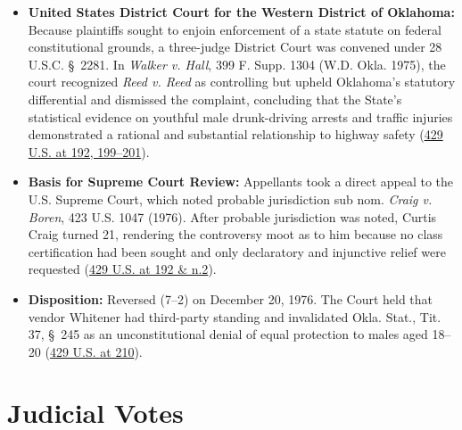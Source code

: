\documentclass[12pt]{article}
\begin{document}
\begin{itemize}
  \item \textbf{United States District Court for the Western District of Oklahoma:} Because plaintiffs sought to enjoin enforcement of a state statute on federal constitutional grounds, a three-judge District Court was convened under 28 U.S.C. \S\ 2281. In \textit{Walker v. Hall}, 399 F. Supp. 1304 (W.D. Okla. 1975), the court recognized \textit{Reed v. Reed} as controlling but upheld Oklahoma's statutory differential and dismissed the complaint, concluding that the State's statistical evidence on youthful male drunk-driving arrests and traffic injuries demonstrated a rational and substantial relationship to highway safety (\href{https://supreme.justia.com/cases/federal/us/429/190/}{429 U.S. at 192, 199--201}).
  \item \textbf{Basis for Supreme Court Review:} Appellants took a direct appeal to the U.S. Supreme Court, which noted probable jurisdiction sub nom. \textit{Craig v. Boren}, 423 U.S. 1047 (1976). After probable jurisdiction was noted, Curtis Craig turned 21, rendering the controversy moot as to him because no class certification had been sought and only declaratory and injunctive relief were requested (\href{https://supreme.justia.com/cases/federal/us/429/190/}{429 U.S. at 192 \& n.2}).
  \item \textbf{Disposition:} Reversed (7--2) on December 20, 1976. The Court held that vendor Whitener had third-party standing and invalidated Okla. Stat., Tit. 37, \S\ 245 as an unconstitutional denial of equal protection to males aged 18--20 (\href{https://tile.loc.gov/storage-services/service/ll/usrep/usrep429/usrep429190/usrep429190.pdf}{429 U.S. at 210}).
\end{itemize}

\section{Judicial Votes}
\end{document}
